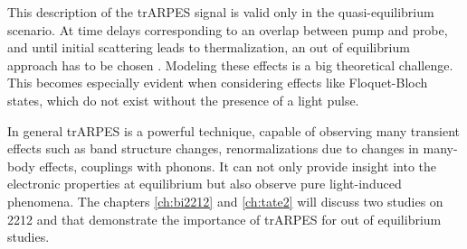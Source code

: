 This description of the trARPES signal is valid only in the quasi-equilibrium scenario.
At time delays corresponding to an overlap between pump and probe, and until initial scattering leads to thermalization, an out of equilibrium approach has to be chosen \cite{schuler_theory_2021, freericks_what_2021,neufeld_time-_2022}.
Modeling these effects is a big theoretical challenge.
This becomes especially evident when considering effects like Floquet-Bloch states, which do not exist without the presence of a light pulse.

In general trARPES is a powerful technique, capable of observing many transient effects such as band structure changes, renormalizations due to changes in many-body effects, couplings with phonons.
It can not only provide insight into the electronic properties at equilibrium but also observe pure light-induced phenomena.
The chapters \ref{ch:bi2212} and \ref{ch:tate2} will discuss two studies on 2212 and  that demonstrate the importance of trARPES for out of equilibrium studies.